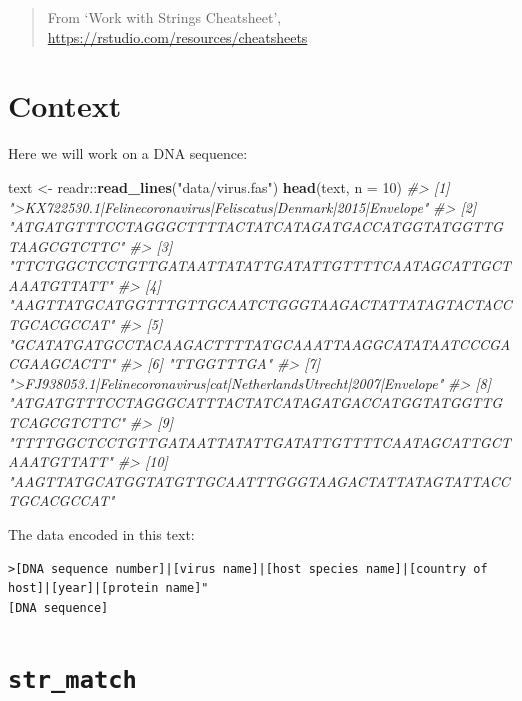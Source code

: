 \documentclass[]{book}
\newenvironment{Shaded}{}{}
\newcommand{\CommentTok}[1]{\textcolor[rgb]{0.38,0.63,0.69}{\textit{#1}}}
\newcommand{\DataTypeTok}[1]{\textcolor[rgb]{0.56,0.13,0.00}{#1}}
\newcommand{\DecValTok}[1]{\textcolor[rgb]{0.25,0.63,0.44}{#1}}
\newcommand{\KeywordTok}[1]{\textcolor[rgb]{0.00,0.44,0.13}{\textbf{#1}}}
\newcommand{\NormalTok}[1]{#1}
\newcommand{\OperatorTok}[1]{\textcolor[rgb]{0.40,0.40,0.40}{#1}}
\newcommand{\StringTok}[1]{\textcolor[rgb]{0.25,0.44,0.63}{#1}}
\begin{document}
\begin{quote}
From `Work with Strings Cheatsheet', \url{https://rstudio.com/resources/cheatsheets}
\end{quote}

\hypertarget{context}{%
\section{Context}\label{context}}

Here we will work on a DNA sequence:

\begin{Shaded}
\begin{Highlighting}[]
\NormalTok{text <-}\StringTok{ }\NormalTok{readr}\OperatorTok{::}\KeywordTok{read_lines}\NormalTok{(}\StringTok{"data/virus.fas"}\NormalTok{)}
\KeywordTok{head}\NormalTok{(text, }\DataTypeTok{n =} \DecValTok{10}\NormalTok{)}
\CommentTok{#>  [1] ">KX722530.1|Felinecoronavirus|Feliscatus|Denmark|2015|Envelope"    }
\CommentTok{#>  [2] "ATGATGTTTCCTAGGGCTTTTACTATCATAGATGACCATGGTATGGTTGTAAGCGTCTTC"      }
\CommentTok{#>  [3] "TTCTGGCTCCTGTTGATAATTATATTGATATTGTTTTCAATAGCATTGCTAAATGTTATT"      }
\CommentTok{#>  [4] "AAGTTATGCATGGTTTGTTGCAATCTGGGTAAGACTATTATAGTACTACCTGCACGCCAT"      }
\CommentTok{#>  [5] "GCATATGATGCCTACAAGACTTTTATGCAAATTAAGGCATATAATCCCGACGAAGCACTT"      }
\CommentTok{#>  [6] "TTGGTTTGA"                                                         }
\CommentTok{#>  [7] ">FJ938053.1|Felinecoronavirus|cat|NetherlandsUtrecht|2007|Envelope"}
\CommentTok{#>  [8] "ATGATGTTTCCTAGGGCATTTACTATCATAGATGACCATGGTATGGTTGTCAGCGTCTTC"      }
\CommentTok{#>  [9] "TTTTGGCTCCTGTTGATAATTATATTGATATTGTTTTCAATAGCATTGCTAAATGTTATT"      }
\CommentTok{#> [10] "AAGTTATGCATGGTATGTTGCAATTTGGGTAAGACTATTATAGTATTACCTGCACGCCAT"}
\end{Highlighting}
\end{Shaded}

The data encoded in this text:

\begin{verbatim}
>[DNA sequence number]|[virus name]|[host species name]|[country of host]|[year]|[protein name]"
[DNA sequence]
\end{verbatim}

\hypertarget{str_match}{%
\section{\texorpdfstring{\texttt{str\_match}}{str\_match}}\label{str_match}}
\end{document}
